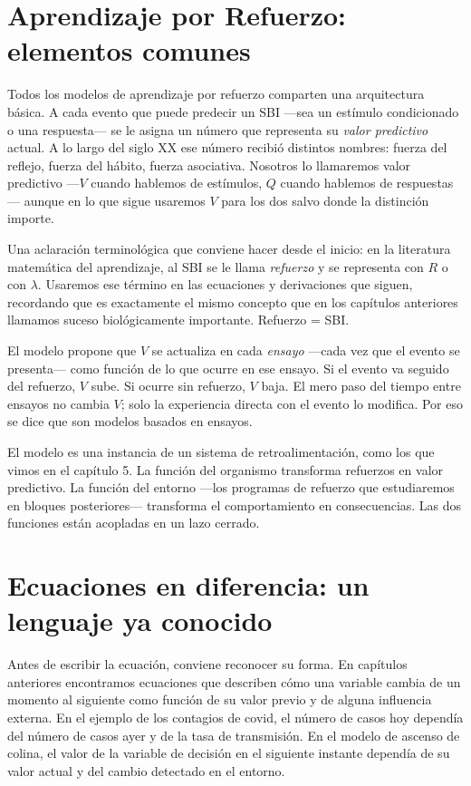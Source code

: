 \documentclass[
  letterpaper,
  DIV=11,
  numbers=noendperiod]{scrreprt}
\begin{document}
\begin{tcolorbox}[enhanced jigsaw, arc=.35mm, bottomrule=.15mm, breakable, colback=white, colframe=quarto-callout-note-color-frame, left=2mm, leftrule=.75mm, opacityback=0, rightrule=.15mm, toprule=.15mm]
\section{Aprendizaje por Refuerzo: elementos
comunes}\label{aprendizaje-por-refuerzo-elementos-comunes}

Todos los modelos de aprendizaje por refuerzo comparten una arquitectura
básica. A cada evento que puede predecir un SBI ---sea un estímulo
condicionado o una respuesta--- se le asigna un número que representa su
\emph{valor predictivo} actual. A lo largo del siglo XX ese número
recibió distintos nombres: fuerza del reflejo, fuerza del hábito, fuerza
asociativa. Nosotros lo llamaremos valor predictivo ---\(V\) cuando
hablemos de estímulos, \(Q\) cuando hablemos de respuestas--- aunque en
lo que sigue usaremos \(V\) para los dos salvo donde la distinción
importe.

Una aclaración terminológica que conviene hacer desde el inicio: en la
literatura matemática del aprendizaje, al SBI se le llama
\emph{refuerzo} y se representa con \(R\) o con \(\lambda\). Usaremos
ese término en las ecuaciones y derivaciones que siguen, recordando que
es exactamente el mismo concepto que en los capítulos anteriores
llamamos suceso biológicamente importante. Refuerzo = SBI.

El modelo propone que \(V\) se actualiza en cada \emph{ensayo} ---cada
vez que el evento se presenta--- como función de lo que ocurre en ese
ensayo. Si el evento va seguido del refuerzo, \(V\) sube. Si ocurre sin
refuerzo, \(V\) baja. El mero paso del tiempo entre ensayos no cambia
\(V\); solo la experiencia directa con el evento lo modifica. Por eso se
dice que son modelos basados en ensayos.

El modelo es una instancia de un sistema de retroalimentación, como los
que vimos en el capítulo 5. La función del organismo transforma
refuerzos en valor predictivo. La función del entorno ---los programas
de refuerzo que estudiaremos en bloques posteriores--- transforma el
comportamiento en consecuencias. Las dos funciones están acopladas en un
lazo cerrado.

\section{Ecuaciones en diferencia: un lenguaje ya
conocido}\label{ecuaciones-en-diferencia-un-lenguaje-ya-conocido}

Antes de escribir la ecuación, conviene reconocer su forma. En capítulos
anteriores encontramos ecuaciones que describen cómo una variable cambia
de un momento al siguiente como función de su valor previo y de alguna
influencia externa. En el ejemplo de los contagios de covid, el número
de casos hoy dependía del número de casos ayer y de la tasa de
transmisión. En el modelo de ascenso de colina, el valor de la variable
de decisión en el siguiente instante dependía de su valor actual y del
cambio detectado en el entorno.


\end{tcolorbox}
\end{document}
